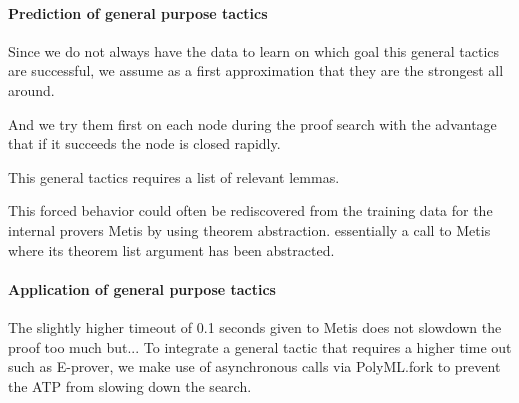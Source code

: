\documentclass[runningheads,a4paper,draft]{svjour3}
\def\eprover{\textsf{E-prover}\xspace}
\def\metis{\textsf{Metis}\xspace}
\begin{document}
\paragraph{Prediction of general purpose tactics}
Since we do not always have the data to learn on which goal this general 
tactics are successful, we assume as a first approximation that they are the 
strongest all around. 

And we try them first on each node during the proof search with the advantage 
that if it succeeds the node is closed rapidly.

This general tactics requires a list of relevant lemmas.

This forced behavior could often be rediscovered from the training data for the 
internal provers \metis by using theorem abstraction. essentially a call to 
\metis where its 
theorem list argument has been abstracted.


\paragraph{Application of general purpose tactics}
The slightly higher timeout of 0.1 seconds given to \metis does not slowdown 
the proof too much but...
To integrate a general tactic that requires a higher time out such as \eprover, 
we make use of asynchronous calls via PolyML.fork to prevent the ATP 
from slowing down the search. 



%
%

\end{document}
